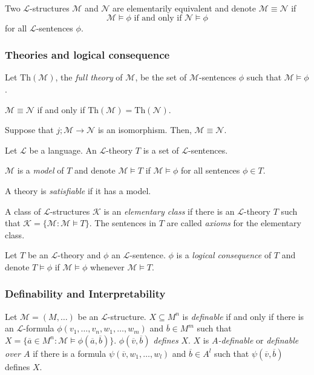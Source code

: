 \documentclass[
	fontsize=10pt, %
]{kaohandt}
\begin{document}
\begin{definition}
    Two $\mathcal{L}$-structures $\mathcal{M}$ and $\mathcal{N}$ are elementarily equivalent and denote $\mathcal{M} \equiv \mathcal{N}$ if
    \[
    \mathcal{M} \models \phi \text{ if and only if }\mathcal{N} \models \phi
    \]
    for all $\mathcal{L}$-sentences $\phi$.
\end{definition}

\subsubsection{Theories and logical consequence}
Let $\mathrm{Th}(\mathcal{M})$, the \emph{full theory} of $\mathcal{M}$,
be the set of $\mathcal{M}$-sentences $\phi$ such that $\mathcal{M} \models \phi$.

$\mathcal{M} \equiv \mathcal{N}$ if and only if $\mathrm{Th}(\mathcal{M}) = \mathrm{Th}(\mathcal{N})$.

\begin{theorem}
    Suppose that $j; \mathcal{M} \to \mathcal{N}$ is an isomorphism.
    Then, $\mathcal{M} \equiv \mathcal{N}$.
\end{theorem}

Let $\mathcal{L}$ be a language.
An $\mathcal{L}$-theory $T$ is a set of $\mathcal{L}$-sentences.

$\mathcal{M}$ is a \emph{model} of $T$ and denote $\mathcal{M} \models T$ if $\mathcal{M} \models \phi$ for all sentences $\phi \in T$.

A theory is \emph{satisfiable} if it has a model.

A class of $\mathcal{L}$-structures $\mathcal{K}$ is an \emph{elementary class} if there is an $\mathcal{L}$-theory $T$ such that $\mathcal{K} = \{ \mathcal{M}:\mathcal{M} \models T \}$.
The sentences in $T$ are called \emph{axioms} for the elementary class.

\begin{definition}
    Let $T$ be an $\mathcal{L}$-theory and $\phi$ an $\mathcal{L}$-sentence.
    $\phi$ is a \emph{logical consequence} of $T$ and denote $T \models \phi$ if $\mathcal{M} \models \phi$ whenever $\mathcal{M} \models T$.
\end{definition}

\subsubsection{Definability and Interpretability}
\begin{definition}
    Let $\mathcal{M} = (M,\dots)$ be an $\mathcal{L}$-structure.
    $X \subseteq M^n$ is \emph{definable} if and only if there is an $\mathcal{L}$-formula $\phi(v_1,\dots,v_n,w_1,\dots,w_m)$ and $\overline{b} \in M^m$ such that 
    $X = \{ \overline{a} \in M^n : \mathcal{M} \models \phi(\overline{a},\overline{b}) \}$.
    $\phi(\overline{v},\overline{b})$ \emph{defines} $X$.
    $X$ is \emph{$A$-definable }or \emph{definable over $A$} 
    if there is a formula $\psi(\overline{v},w_1,\dots,w_l)$ and $\overline{b} \in A^l$ such that $\psi(\overline{v},\overline{b})$ defines $X$.
\end{definition}
\end{document}
